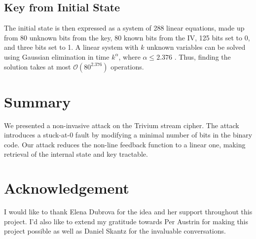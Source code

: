 \documentclass[conference]{IEEEtran}
\begin{document}
\subsection{Key from Initial State}

The initial state is then expressed as a system of 288 linear equations, made up from 80 unknown bits from the key, 80 known bits from the IV, 125 bits set to 0, and three bits set to 1. A linear system with $k$ unknown variables can be solved using Gaussian elimination in time $k^\alpha$, where $\alpha\leq 2.376$ \cite{gauss}. Thus, finding the solution takes at most $\mathcal{O}(80^{2.376})$ operations.
 
\section{Summary}

We presented a non-invasive attack on the Trivium stream cipher. The attack introduces a stuck-at-0 fault by modifying a minimal number of bits in the binary code. Our attack reduces the non-line feedback function to a linear one, making retrieval of the internal state and key tractable.

\section*{Acknowledgement}

I would like to thank Elena Dubrova for the idea and her support throughout this project. I'd also like to extend my gratitude towards Per Austrin for making this project possible as well as Daniel Skantz for the invaluable conversations.



\nocite{*}
\end{document}
